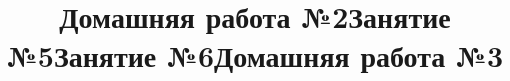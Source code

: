 \newpage
\title{Домашняя работа №2}
\begin{listofex}
	\item {}
	\item {}
	\item {}
	\item {}
	\item {}
	\item {}
	\item {}
\end{listofex}
\newpage
\title{Занятие №5}
\begin{listofex}
	\item {}
	\item {}
	\item {}
	\item {}
	\item {}
	\item {}
	\item {}
	\item {}
\end{listofex}
\newpage
\title{Занятие №6}
\begin{listofex}
	\item {}
	\item {}
	\item {}
	\item {}
	\item {}
	\item {}
	\item {}
	\item {}
	\item {}
\end{listofex}
\newpage
\title{Домашняя работа №3}
\begin{listofex}
	\item {}
	\item {}
	\item {}
	\item {}
	\item {}
	\item {}
	\item {}
\end{listofex}
